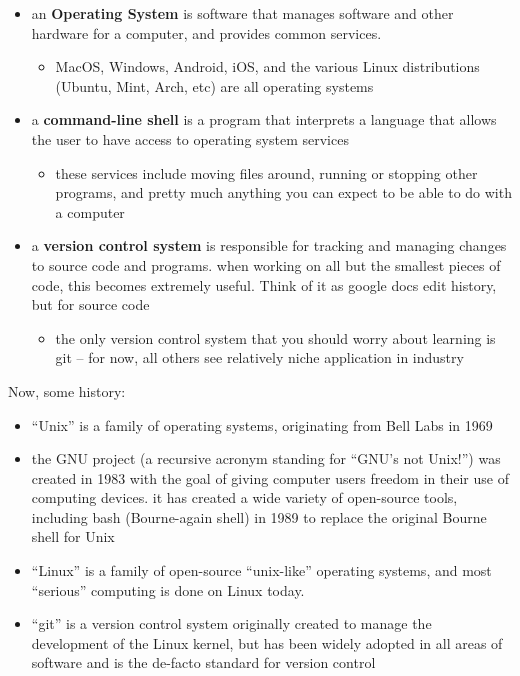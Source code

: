 \documentclass[
]{article}
\providecommand{\tightlist}{%
  \setlength{\itemsep}{0pt}\setlength{\parskip}{0pt}}
\begin{document}
\begin{itemize}
\tightlist
\item
  an \textbf{Operating System} is software that manages software and
  other hardware for a computer, and provides common services.

  \begin{itemize}
  \tightlist
  \item
    MacOS, Windows, Android, iOS, and the various Linux distributions
    (Ubuntu, Mint, Arch, etc) are all operating systems
  \end{itemize}
\item
  a \textbf{command-line shell} is a program that interprets a language
  that allows the user to have access to operating system services

  \begin{itemize}
  \tightlist
  \item
    these services include moving files around, running or stopping
    other programs, and pretty much anything you can expect to be able
    to do with a computer
  \end{itemize}
\item
  a \textbf{version control system} is responsible for tracking and
  managing changes to source code and programs. when working on all but
  the smallest pieces of code, this becomes extremely useful. Think of
  it as google docs edit history, but for source code

  \begin{itemize}
  \tightlist
  \item
    the only version control system that you should worry about learning
    is git -- for now, all others see relatively niche application in
    industry
  \end{itemize}
\end{itemize}

Now, some history:

\begin{itemize}
\tightlist
\item
  ``Unix'' is a family of operating systems, originating from Bell Labs
  in 1969
\item
  the GNU project (a recursive acronym standing for ``GNU's not Unix!'')
  was created in 1983 with the goal of giving computer users freedom in
  their use of computing devices. it has created a wide variety of
  open-source tools, including bash (Bourne-again shell) in 1989 to
  replace the original Bourne shell for Unix
\item
  ``Linux'' is a family of open-source ``unix-like'' operating systems,
  and most ``serious'' computing is done on Linux today.
\item
  ``git'' is a version control system originally created to manage the
  development of the Linux kernel, but has been widely adopted in all
  areas of software and is the de-facto standard for version control
\end{itemize}
\end{document}
